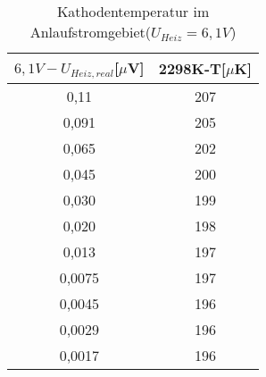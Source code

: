 \begin{table}[h]
	\begin{center}
		\begin{tabular}{cc}
			$6{,}1V-U_{Heiz,real}$[$\mu$V]&2298K-T[$\mu$K] \\ \hline
			0,11&207 \\
			0,091&205\\
			0,065&202\\
			0,045&200\\
			0,030&199\\
			0,020&198\\
			0,013&197\\
			0,0075&197\\
			0,0045&196\\
			0,0029&196\\
			0,0017&196
		\end{tabular}
		\caption{Kathodentemperatur im Anlaufstromgebiet($U_{Heiz}=6,1V$)}
		\label{tabc1}
	\end{center}
\end{table}